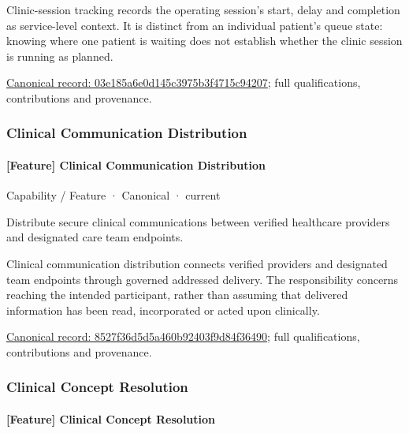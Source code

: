 Clinic-session tracking records the operating session's start, delay and completion as service-level context. It is distinct from an individual patient's queue state: knowing where one patient is waiting does not establish whether the clinic session is running as planned.


{\footnotesize \href{../../../../continuum/strategy/capability/feature/03e185a6e0d145c3975b3f4715c94207.md}{Canonical record: 03e185a6e0d145c3975b3f4715c94207}; full qualifications, contributions and provenance.}\par
\subsubsection{Clinical Communication Distribution}

\paragraph{[Feature] Clinical Communication Distribution}

\label{element:8527f36d5d5a460b92403f9d84f36490}
{\small Capability / Feature · Canonical · current}\par

Distribute secure clinical communications between verified healthcare providers and designated care team endpoints.



Clinical communication distribution connects verified providers and designated team endpoints through governed addressed delivery. The responsibility concerns reaching the intended participant, rather than assuming that delivered information has been read, incorporated or acted upon clinically.


{\footnotesize \href{../../../../continuum/strategy/capability/feature/8527f36d5d5a460b92403f9d84f36490.md}{Canonical record: 8527f36d5d5a460b92403f9d84f36490}; full qualifications, contributions and provenance.}\par
\subsubsection{Clinical Concept Resolution}

\paragraph{[Feature] Clinical Concept Resolution}

